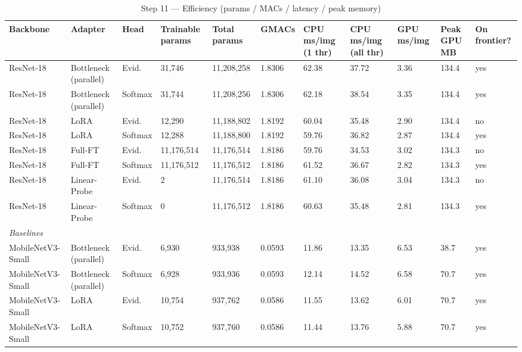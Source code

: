 \begin{table}[t]
\centering
\caption{Step 11 — Efficiency (params / MACs / latency / peak memory)}
\begin{tabular}{lllllllllll}
\toprule
Backbone & Adapter & Head & Trainable params & Total params & GMACs & CPU ms/img (1 thr) & CPU ms/img (all thr) & GPU ms/img & Peak GPU MB & On frontier? \\
\midrule
ResNet-18 & Bottleneck (parallel) & Evid. & 31,746 & 11,208,258 & 1.8306 & 62.38 & 37.72 & 3.36 & 134.4 & yes \\
ResNet-18 & Bottleneck (parallel) & Softmax & 31,744 & 11,208,256 & 1.8306 & 62.18 & 38.54 & 3.35 & 134.4 & yes \\
ResNet-18 & LoRA & Evid. & 12,290 & 11,188,802 & 1.8192 & 60.04 & 35.48 & 2.90 & 134.4 & no \\
ResNet-18 & LoRA & Softmax & 12,288 & 11,188,800 & 1.8192 & 59.76 & 36.82 & 2.87 & 134.4 & yes \\
ResNet-18 & Full-FT & Evid. & 11,176,514 & 11,176,514 & 1.8186 & 59.76 & 34.53 & 3.02 & 134.3 & no \\
ResNet-18 & Full-FT & Softmax & 11,176,512 & 11,176,512 & 1.8186 & 61.52 & 36.67 & 2.82 & 134.3 & yes \\
ResNet-18 & Linear-Probe & Evid. & 2 & 11,176,514 & 1.8186 & 61.10 & 36.08 & 3.04 & 134.3 & no \\
ResNet-18 & Linear-Probe & Softmax & 0 & 11,176,512 & 1.8186 & 60.63 & 35.48 & 2.81 & 134.3 & yes \\
\midrule
\multicolumn{11}{l}{\textit{Baselines}} \\
\midrule
MobileNetV3-Small & Bottleneck (parallel) & Evid. & 6,930 & 933,938 & 0.0593 & 11.86 & 13.35 & 6.53 & 38.7 & yes \\
MobileNetV3-Small & Bottleneck (parallel) & Softmax & 6,928 & 933,936 & 0.0593 & 12.14 & 14.52 & 6.58 & 70.7 & yes \\
MobileNetV3-Small & LoRA & Evid. & 10,754 & 937,762 & 0.0586 & 11.55 & 13.62 & 6.01 & 70.7 & yes \\
MobileNetV3-Small & LoRA & Softmax & 10,752 & 937,760 & 0.0586 & 11.44 & 13.76 & 5.88 & 70.7 & yes \\
\bottomrule
\end{tabular}
\end{table}
